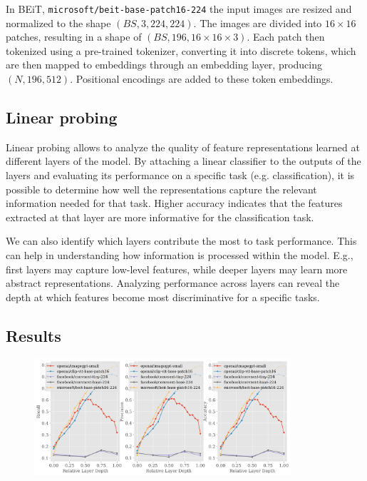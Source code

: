 \documentclass[
  11pt,
  a4paper,
  onecolumn]{article}
\begin{document}
In BEiT, \texttt{microsoft/beit-base-patch16-224} the input images are resized and normalized to the shape $(BS, 3, 224, 224)$. The images are divided into $16 \times 16$ patches, resulting in a shape of $(BS, 196, 16 \times 16 \times 3)$. Each patch then tokenized using a pre-trained tokenizer, converting it into discrete tokens, which are then mapped to embeddings through an embedding layer, producing $(N, 196, 512)$. Positional encodings are added to these token embeddings.


\subsection{Linear probing}
Linear probing allows to analyze the quality of feature representations learned at different layers of the model. By attaching a linear classifier to the outputs of the layers and evaluating its performance on a specific task (e.g. classification), it is possible to determine how well the representations capture the relevant information needed for that task. Higher accuracy indicates that the features extracted at that layer are more informative for the classification task.

We can also identify which layers contribute the most to task performance. This can help in understanding how information is processed within the model. E.g., first layers may capture low-level features, while deeper layers may learn more abstract representations. Analyzing performance across layers can reveal the depth at which features become most discriminative for a specific tasks.

\subsection{Results}

\begin{figure}[h!] 
\centering
\includegraphics[width=0.85\textwidth]{figures/probing_plots.png}
\end{figure}
\end{document}
